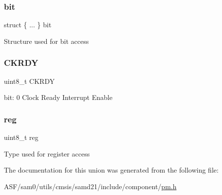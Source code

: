 \subsubsection{\texorpdfstring{bit}{bit}}
{\footnotesize\ttfamily struct \{ ... \}   bit}

Structure used for bit access \mbox{\label{union_p_m___i_n_t_e_n_c_l_r___type_adbe5f3203d63c6431c43561e9fed6517}} 
\subsubsection{\texorpdfstring{CKRDY}{CKRDY}}
{\footnotesize\ttfamily uint8\+\_\+t C\+K\+R\+DY}

bit\+: 0 Clock Ready Interrupt Enable \mbox{\label{union_p_m___i_n_t_e_n_c_l_r___type_a9428adc9af4653a2050e2536b55dec8d}} 
\subsubsection{\texorpdfstring{reg}{reg}}
{\footnotesize\ttfamily uint8\+\_\+t reg}

Type used for register access 

The documentation for this union was generated from the following file\+:\begin{DoxyCompactItemize}
\item 
A\+S\+F/sam0/utils/cmsis/samd21/include/component/\mbox{\hyperlink{component_2pm_8h}{pm.\+h}}\end{DoxyCompactItemize}
